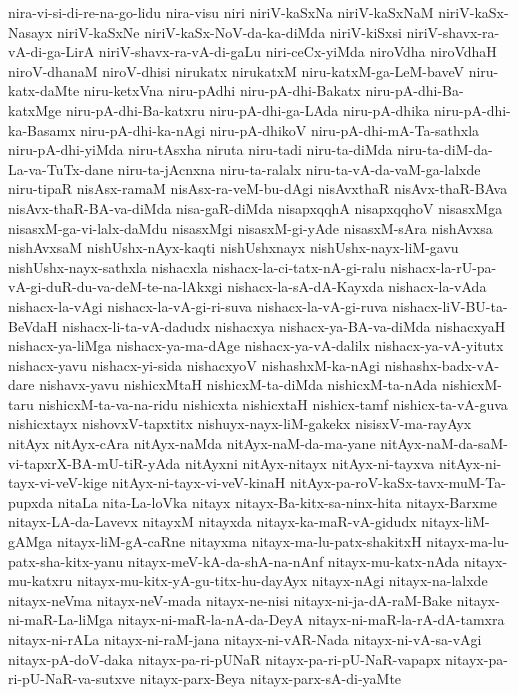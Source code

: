 {nira-vi-si-di-re-na-go-lidu
nira-visu
niri
niriV-kaSxNa
niriV-kaSxNaM
niriV-kaSx-Nasayx
niriV-kaSxNe
niriV-kaSx-NoV-da-ka-diMda
niriV-kiSxsi
niriV-shavx-ra-vA-di-ga-LirA
niriV-shavx-ra-vA-di-gaLu
niri-ceCx-yiMda
niroVdha
niroVdhaH
niroV-dhanaM
niroV-dhisi
nirukatx
nirukatxM
niru-katxM-ga-LeM-baveV
niru-katx-daMte
niru-ketxVna
niru-pAdhi
niru-pA-dhi-Bakatx
niru-pA-dhi-Ba-katxMge
niru-pA-dhi-Ba-katxru
niru-pA-dhi-ga-LAda
niru-pA-dhika
niru-pA-dhi-ka-Basamx
niru-pA-dhi-ka-nAgi
niru-pA-dhikoV
niru-pA-dhi-mA-Ta-sathxla
niru-pA-dhi-yiMda
niru-tAsxha
niruta
niru-tadi
niru-ta-diMda
niru-ta-diM-da-La-va-TuTx-dane
niru-ta-jAcnxna
niru-ta-ralalx
niru-ta-vA-da-vaM-ga-lalxde
niru-tipaR
nisAsx-ramaM
nisAsx-ra-veM-bu-dAgi
nisAvxthaR
nisAvx-thaR-BAva
nisAvx-thaR-BA-va-diMda
nisa-gaR-diMda
nisapxqqhA
nisapxqqhoV
nisasxMga
nisasxM-ga-vi-lalx-daMdu
nisasxMgi
nisasxM-gi-yAde
nisasxM-sAra
nishAvxsa
nishAvxsaM
nishUshx-nAyx-kaqti
nishUshxnayx
nishUshx-nayx-liM-gavu
nishUshx-nayx-sathxla
nishacxla
nishacx-la-ci-tatx-nA-gi-ralu
nishacx-la-rU-pa-vA-gi-duR-du-va-deM-te-na-lAkxgi
nishacx-la-sA-dA-Kayxda
nishacx-la-vAda
nishacx-la-vAgi
nishacx-la-vA-gi-ri-suva
nishacx-la-vA-gi-ruva
nishacx-liV-BU-ta-BeVdaH
nishacx-li-ta-vA-dadudx
nishacxya
nishacx-ya-BA-va-diMda
nishacxyaH
nishacx-ya-liMga
nishacx-ya-ma-dAge
nishacx-ya-vA-dalilx
nishacx-ya-vA-yitutx
nishacx-yavu
nishacx-yi-sida
nishacxyoV
nishashxM-ka-nAgi
nishashx-badx-vA-dare
nishavx-yavu
nishicxMtaH
nishicxM-ta-diMda
nishicxM-ta-nAda
nishicxM-taru
nishicxM-ta-va-na-ridu
nishicxta
nishicxtaH
nishicx-tamf
nishicx-ta-vA-guva
nishicxtayx
nishovxV-tapxtitx
nishuyx-nayx-liM-gakekx
nisisxV-ma-rayAyx
nitAyx
nitAyx-cAra
nitAyx-naMda
nitAyx-naM-da-ma-yane
nitAyx-naM-da-saM-vi-tapxrX-BA-mU-tiR-yAda
nitAyxni
nitAyx-nitayx
nitAyx-ni-tayxva
nitAyx-ni-tayx-vi-veV-kige
nitAyx-ni-tayx-vi-veV-kinaH
nitAyx-pa-roV-kaSx-tavx-muM-Ta-pupxda
nitaLa
nita-La-loVka
nitayx
nitayx-Ba-kitx-sa-ninx-hita
nitayx-Barxme
nitayx-LA-da-Lavevx
nitayxM
nitayxda
nitayx-ka-maR-vA-gidudx
nitayx-liM-gAMga
nitayx-liM-gA-caRne
nitayxma
nitayx-ma-lu-patx-shakitxH
nitayx-ma-lu-patx-sha-kitx-yanu
nitayx-meV-kA-da-shA-na-nAnf
nitayx-mu-katx-nAda
nitayx-mu-katxru
nitayx-mu-kitx-yA-gu-titx-hu-dayAyx
nitayx-nAgi
nitayx-na-lalxde
nitayx-neVma
nitayx-neV-mada
nitayx-ne-nisi
nitayx-ni-ja-dA-raM-Bake
nitayx-ni-maR-La-liMga
nitayx-ni-maR-la-nA-da-DeyA
nitayx-ni-maR-la-rA-dA-tamxra
nitayx-ni-rALa
nitayx-ni-raM-jana
nitayx-ni-vAR-Nada
nitayx-ni-vA-sa-vAgi
nitayx-pA-doV-daka
nitayx-pa-ri-pUNaR
nitayx-pa-ri-pU-NaR-vapapx
nitayx-pa-ri-pU-NaR-va-sutxve
nitayx-parx-Beya
nitayx-parx-sA-di-yaMte
}
